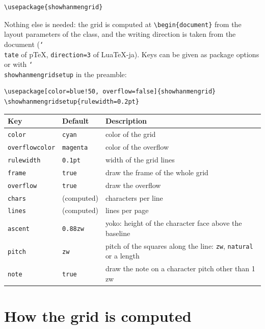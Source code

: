 \documentclass{article}
\newcommand*\cs[1]{\texttt{\char`\\#1}}
\newcommand*\key[1]{\texttt{#1}}
\begin{document}
\begin{verbatim}
\usepackage{showhanmengrid}
\end{verbatim}
Nothing else is needed: the grid is computed at \verb|\begin{document}|
from the layout parameters of the class, and the writing direction is
taken from the document (\cs{tate} of pTeX, \texttt{direction=3} of
LuaTeX-ja).  Keys can be given as package options or with
\cs{showhanmengridsetup} in the preamble:
\begin{verbatim}
\usepackage[color=blue!50, overflow=false]{showhanmengrid}
\showhanmengridsetup{rulewidth=0.2pt}
\end{verbatim}

\begin{center}
\begin{tabular}{lll}
  \hline
  Key & Default & Description\\
  \hline
  \key{color}         & \texttt{cyan}    & color of the grid\\
  \key{overflowcolor} & \texttt{magenta} & color of the overflow\\
  \key{rulewidth}     & \texttt{0.1pt}   & width of the grid lines\\
  \key{frame}         & \texttt{true}    & draw the frame of the whole grid\\
  \key{overflow}      & \texttt{true}    & draw the overflow\\
  \key{chars}         & (computed)       & characters per line\\
  \key{lines}         & (computed)       & lines per page\\
  \key{ascent}        & \texttt{0.88zw}  & yoko: height of the character
                                           face above the baseline\\
  \key{pitch}         & \texttt{zw}      & pitch of the squares along the
                                           line: \texttt{zw},
                                           \texttt{natural} or a length\\
  \key{note}          & \texttt{true}    & draw the note on a character
                                           pitch other than 1\,zw\\
  \hline
\end{tabular}
\end{center}

\section{How the grid is computed}
\end{document}
